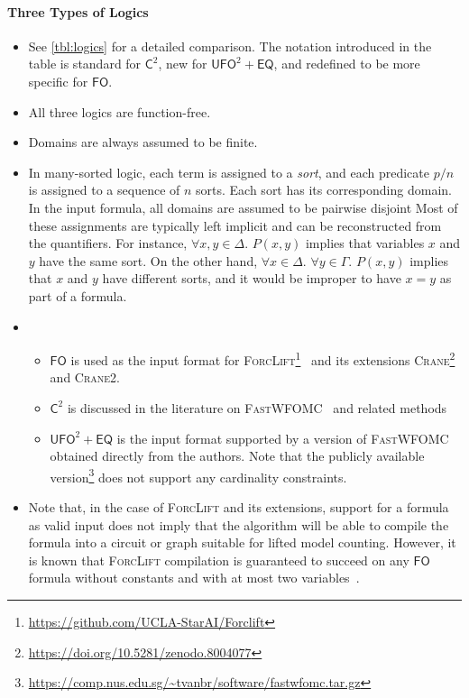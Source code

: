 \documentclass{article}
\theoremstyle{definition}
\newcommand{\Ctwo}{$\mathsf{C}^{2}$}
\newcommand{\FO}{$\mathsf{FO}$}
\newcommand{\UFO}{$\mathsf{UFO}^{2} + \mathsf{EQ}$}
\newcommand{\Cranetwo}{\textsc{Crane2}}
\begin{document}
\paragraph{Three Types of Logics}
\begin{itemize}
  \item See \cref{tbl:logics} for a detailed comparison. The notation introduced
        in the table is standard for \Ctwo{}, new for \UFO{}, and redefined to
        be more specific for \FO{}.
  \item All three logics are function-free.
  \item Domains are always assumed to be finite.
  \item In many-sorted logic, each term is assigned to a \emph{sort}, and each
        predicate $p/n$ is assigned to a sequence of $n$ sorts. Each sort has
        its corresponding domain. In the input formula, all domains are assumed
        to be pairwise disjoint Most of these assignments are typically left
        implicit and can be reconstructed from the quantifiers. For instance,
        $\forall x,y \in \Delta\text{. }P(x, y)$ implies that variables $x$ and
        $y$ have the same sort. On the other hand, $\forall x \in \Delta\text{.
        }\forall y \in \Gamma\text{. } P(x, y)$ implies that $x$ and $y$ have
        different sorts, and it would be improper to have $x = y$ as part of a
        formula.
  \item
        \begin{itemize}
          \item \FO{} is used as the input format for
                \textsc{ForcLift}\footnote{\url{https://github.com/UCLA-StarAI/Forclift}}~\cite{DBLP:conf/ijcai/BroeckTMDR11}
                and its extensions
                \textsc{Crane}\footnote{\url{https://doi.org/10.5281/zenodo.8004077}}~\cite{DBLP:conf/kr/DilkasB23}
                and \Cranetwo{}.
          \item \Ctwo{} is discussed in the literature on
                \textsc{FastWFOMC}~\cite{DBLP:conf/uai/BremenK21} and related
                methods~\cite{DBLP:journals/jair/Kuzelka21,DBLP:conf/aaai/MalhotraS22}
          \item \UFO{} is the input format supported by a version of
                \textsc{FastWFOMC} obtained directly from the authors. Note that
                the publicly available
                version\footnote{\url{https://comp.nus.edu.sg/~tvanbr/software/fastwfomc.tar.gz}}
                does not support any cardinality constraints.
        \end{itemize}
  \item Note that, in the case of \textsc{ForcLift} and its extensions, support
        for a formula as valid input does not imply that the algorithm will be
        able to compile the formula into a circuit or graph suitable for lifted
        model counting. However, it is known that \textsc{ForcLift} compilation
        is guaranteed to succeed on any \FO{} formula without constants and with
        at most two variables~\cite{DBLP:conf/nips/Broeck11}.
\end{itemize}
\end{document}
